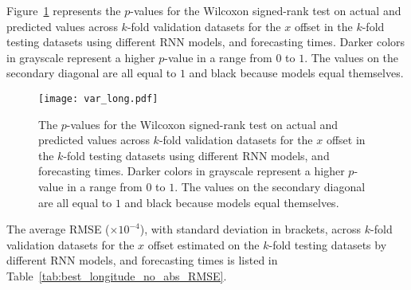 Figure~\ref{fig:var_long} represents the $p$-values for the Wilcoxon signed-rank test on actual and predicted values across $k$-fold validation datasets for the $x$ offset in the $k$-fold testing datasets using different RNN models, and forecasting times. Darker colors in grayscale represent a higher $p$-value in a range from $0$ to $1$. The values on the secondary diagonal are all equal to $1$ and black because models equal themselves.

\begin{figure}[!ht]
	\centering
	\texttt{[image: var\_long.pdf]}
	\caption{The $p$-values for the Wilcoxon signed-rank test on actual and predicted values across $k$-fold validation datasets for the $x$ offset in the $k$-fold testing datasets using different RNN models, and forecasting times. Darker colors in grayscale represent a higher $p$-value in a range from $0$ to $1$. The values on the secondary diagonal are all equal to $1$ and black because models equal themselves.}
	\label{fig:var_long}
\end{figure}

The average RMSE ($\times 10^{-4}$), with standard deviation in brackets, across $k$-fold validation datasets for the $x$ offset estimated on the $k$-fold testing datasets by different RNN models, and forecasting times is listed in Table~\ref{tab:best_longitude_no_abs_RMSE}.

\begin{table}[!ht]
	\centering
	\caption{The average RMSE ($\times 10^{-4}$), with standard deviation in brackets, across $k$-fold validation datasets for the $x$ offset estimated on the $k$-fold testing datasets by different RNN models, and forecasting times.}
	\label{tab:best_longitude_no_abs_RMSE}
\end{table}

